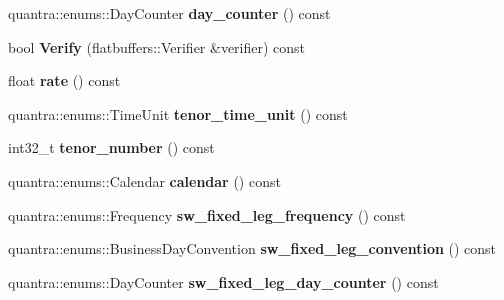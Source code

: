 \begin{DoxyCompactItemize}
quantra\+::enums\+::\+Day\+Counter {\bfseries day\+\_\+counter} () const
\item 
\mbox{\label{structquantra_1_1FLATBUFFERS__FINAL__CLASS_aed693ee5a45b5f53af7411f9cab6793a}} 
bool {\bfseries Verify} (flatbuffers\+::\+Verifier \&verifier) const
\item 
\mbox{\label{structquantra_1_1FLATBUFFERS__FINAL__CLASS_aa5a25f3bfb8a4b4822cb5fcb1b479ff8}} 
float {\bfseries rate} () const
\item 
\mbox{\label{structquantra_1_1FLATBUFFERS__FINAL__CLASS_ab4ab050747fb985c5b2628688cc3658d}} 
quantra\+::enums\+::\+Time\+Unit {\bfseries tenor\+\_\+time\+\_\+unit} () const
\item 
\mbox{\label{structquantra_1_1FLATBUFFERS__FINAL__CLASS_a6da14d412a4e94b493875c800389e10e}} 
int32\+\_\+t {\bfseries tenor\+\_\+number} () const
\item 
\mbox{\label{structquantra_1_1FLATBUFFERS__FINAL__CLASS_a22bef2961bc16a42406e7b6c3d62a33e}} 
quantra\+::enums\+::\+Calendar {\bfseries calendar} () const
\item 
\mbox{\label{structquantra_1_1FLATBUFFERS__FINAL__CLASS_a65434b34834bf4dbff94f974758b3ae3}} 
quantra\+::enums\+::\+Frequency {\bfseries sw\+\_\+fixed\+\_\+leg\+\_\+frequency} () const
\item 
\mbox{\label{structquantra_1_1FLATBUFFERS__FINAL__CLASS_a3812bb5013858730da8e79a4a8327413}} 
quantra\+::enums\+::\+Business\+Day\+Convention {\bfseries sw\+\_\+fixed\+\_\+leg\+\_\+convention} () const
\item 
\mbox{\label{structquantra_1_1FLATBUFFERS__FINAL__CLASS_ac8bc0ab2ac5d61c0d555856d187d150b}} 
quantra\+::enums\+::\+Day\+Counter {\bfseries sw\+\_\+fixed\+\_\+leg\+\_\+day\+\_\+counter} () const
\item 
\mbox{\label{structquantra_1_1FLATBUFFERS__FINAL__CLASS_aeec4877bd50cf902509de636c47e7166}} 

\end{DoxyCompactItemize}
